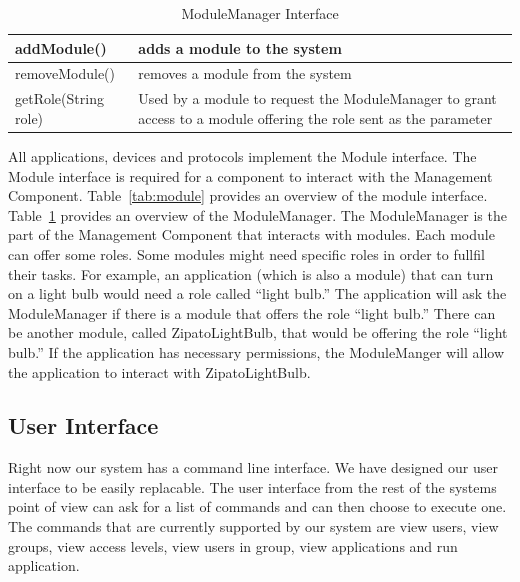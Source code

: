 \begin{table}
\begin{center}
\begin{tabular}{| p{4cm} | p{3cm} |}
\hline
addModule() & adds a module to the system \\ \hline
removeModule() & removes a module from the system \\ \hline
getRole(String role) & Used by a module to request the ModuleManager to grant
access to a module offering the role sent as the parameter  \\ \hline
\end{tabular}
\end{center}
\caption{ModuleManager Interface}
\label{tab:modulemanager}
\end{table}
All applications, devices and protocols implement the Module interface. The
Module interface is required for a component to interact with the Management 
Component. Table~\ref{tab:module} provides an overview of the module interface.
Table~\ref{tab:modulemanager} provides an overview of the ModuleManager.
The ModuleManager is the part of the Management Component that interacts with
modules. Each module can offer some roles. Some modules might need specific
roles in order to fullfil their tasks. For example, an application (which is
also a module) that can turn on a light bulb would need a role called ``light
bulb.'' The application will ask the ModuleManager if there is a module that
offers the role ``light bulb.'' There can be another module, called
ZipatoLightBulb, that would be offering the role ``light bulb.'' If the
application has necessary permissions, the ModuleManger will allow the
application to interact with ZipatoLightBulb.
\subsection{User Interface}
\label{sec:interface}
Right now our system has a command line interface. We have designed our user
interface to be easily replacable. The user interface from the rest of the
systems point of view can ask for a list of commands and can then choose to
execute one. The commands that are currently supported by our system are view
users, view groups, view access levels, view users in group, view applications
and run application.

